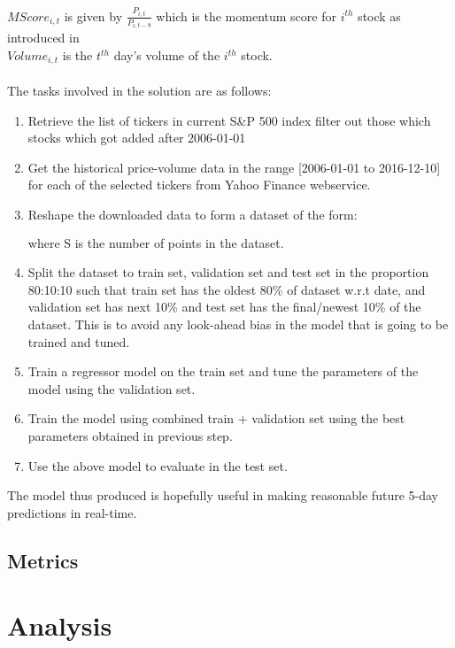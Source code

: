 \documentclass[10pt]{report}
\begin{document}
$MScore_{i,t}$ is given by $\frac{P_{i,t}}{P_{i, t-9}}$ which is the momentum score for $i^{th}$ stock as introduced in \cite{mlfortrading}\\
$Volume_{i,t}$ is the $t^{th}$ day's volume of the $i^{th}$ stock.\\
\\
The tasks involved in the solution are as follows:
\begin{enumerate}
\item Retrieve the list of tickers in current S\&P 500 index filter out those which stocks which got added after 2006-01-01
\item Get the historical price-volume data in the range [2006-01-01 to 2016-12-10] for each of the selected tickers from Yahoo Finance webservice.
\item Reshape the downloaded data to form a dataset of the form: 
\begin{align*}
[&(feature_1, feature_2, ..., feature_n, target)_{t=0},\\
 &(feature_1, feature_2, ..., feature_n, target)_{t=1},\\
 &...\\
 &(feature_1, feature_2, ..., feature_n, target)_{t=S}]\\
\end{align*} where S is the number of points in the dataset.
\item Split the dataset to train set, validation set and test set in the proportion 80:10:10 such that train set has the oldest 80\% of dataset w.r.t date, and validation set has next 10\% and test set has the final/newest 10\% of the dataset. This is to avoid any look-ahead bias in the model that is going to be trained and tuned.
\item Train a regressor model on the train set and tune the parameters of the model using the validation set.
\item Train the model using combined train + validation set using the best parameters obtained in previous step.
\item Use the above model to evaluate in the test set.
\end{enumerate}
The model thus produced is hopefully useful in making reasonable future 5-day predictions in real-time.

\subsection*{Metrics}

\section{Analysis}
\end{document}
